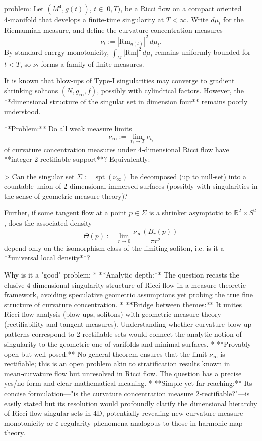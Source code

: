 problem:  
Let $(M^4,g(t))$, $t\in[0,T)$, be a Ricci flow on a compact oriented 4‑manifold that develops a finite‑time singularity at $T<\infty$.  
Write $d\mu_t$ for the Riemannian measure, and define the curvature concentration measures
\[
\nu_t := |\mathrm{Rm}_{g(t)}|^2\, d\mu_t.
\]
By standard energy monotonicity, $\int_M |\mathrm{Rm}|^2\, d\mu_t$ remains uniformly bounded for $t<T$, so $\nu_t$ forms a family of finite measures.  

It is known that blow‑ups of Type‑I singularities may converge to gradient shrinking solitons $(N,g_\infty,f)$, possibly with cylindrical factors.  However, the **dimensional structure of the singular set in dimension four** remains poorly understood.

**Problem:**  
Do all weak measure limits  
\[
\nu_\infty := \lim_{t_i\to T}\nu_{t_i}
\]
of curvature concentration measures under 4‑dimensional Ricci flow have **integer 2‑rectifiable support**?  Equivalently:  

> Can the singular set $\Sigma:=\operatorname{spt}(\nu_\infty)$ be decomposed (up to null‑set) into a countable union of 2‑dimensional immersed surfaces (possibly with singularities in the sense of geometric measure theory)?  

Further, if some tangent flow at a point $p\in\Sigma$ is a shrinker asymptotic to $\mathbb{R}^2\times S^2$, does the associated density
\[
\Theta(p):=\lim_{r\to 0}\frac{\nu_\infty(B_r(p))}{\pi r^2}
\]
depend only on the isomorphism class of the limiting soliton, i.e. is it a **universal local density**?  

Why is it a "good" problem:  
* **Analytic depth:** The question recasts the elusive 4‑dimensional singularity structure of Ricci flow in a measure‑theoretic framework, avoiding speculative geometric assumptions yet probing the true fine structure of curvature concentration.  
* **Bridge between themes:** It unites Ricci‑flow analysis (blow‑ups, solitons) with geometric measure theory (rectifiability and tangent measures).  Understanding whether curvature blow‑up patterns correspond to 2‑rectifiable sets would connect the analytic notion of singularity to the geometric one of varifolds and minimal surfaces.  
* **Provably open but well‑posed:** No general theorem ensures that the limit $\nu_\infty$ is rectifiable; this is an open problem akin to stratification results known in mean‑curvature flow but unresolved in Ricci flow.  The question has a precise yes/no form and clear mathematical meaning.  
* **Simple yet far‑reaching:** Its concise formulation—"is the curvature concentration measure 2‑rectifiable?"—is easily stated but its resolution would profoundly clarify the dimensional hierarchy of Ricci‑flow singular sets in 4D, potentially revealing new curvature‑measure monotonicity or $\varepsilon$‑regularity phenomena analogous to those in harmonic map theory.